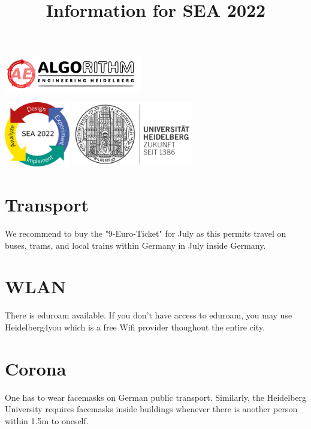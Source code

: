 \documentclass{article}
\title{Information for SEA 2022}
\date{}
\begin{document}
\begin{center}
\begin{minipage}{5cm}
\vspace*{-2.4cm}
        \includegraphics[width=6cm]{logo3}
        \end{minipage}
        \hspace*{1.5cm}
        \includegraphics[width=2.85cm]{tasseentwurf_vec_sea}
        \hspace*{.5cm}
        \includegraphics[width=5.3cm]{heidelberg-university.png}
\end{center}
\section{Transport}
We recommend to buy the "9-Euro-Ticket" for July as this permits travel on buses, trams, and local trains within Germany in July inside Germany. 
\section{WLAN}
There is eduroam available. If you don't have access to eduroam, you may use Heidelberg4you which is a free Wifi provider thoughout the entire city.
\section{Corona}
One has to wear facemasks on German public transport. Similarly, the Heidelberg University requires facemasks inside buildings whenever there is another person within 1.5m to oneself. 
\end{document}
